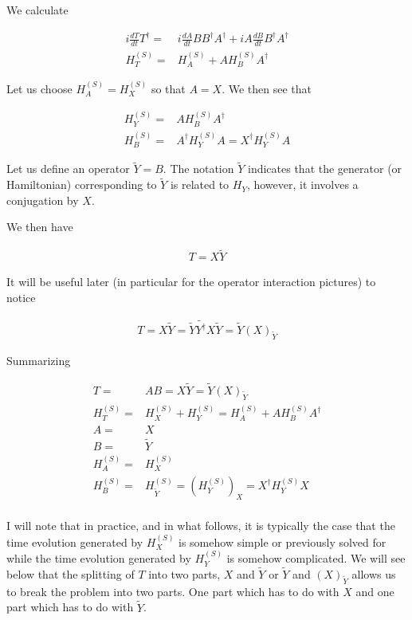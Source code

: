 \documentclass[12pt]{article}
\begin{document}
We calculate

\begin{align}
i\frac{dT}{dt}T^{\dag} =& i\frac{dA}{dt}BB^{\dag}A^{\dag} + iA\frac{dB}{dt}B^{\dag}A^{\dag} \nonumber\\
H_T^{(S)} =& H_A^{(S)} + AH_B^{(S)}A^{\dag}
\end{align}

Let us choose $H_A^{(S)} = H_X^{(S)}$ so that $A=X$.
We then see that 

\begin{align}
H_Y^{(S)} =& AH_B^{(S)}A^{\dag} \nonumber\\
H_B^{(S)} =& A^{\dag}H_Y^{(S)}A = X^{\dag}H_Y^{(S)}A
\end{align}

Let us define an operator $\tilde{Y}=B$.
The notation $\tilde{Y}$ indicates that the generator (or Hamiltonian) corresponding to $\tilde{Y}$ is related to $H_Y$, however, it involves a conjugation by $X$.

We then have

\begin{align}
T = X\tilde{Y}
\end{align}

It will be useful later (in particular for the operator interaction pictures) to notice

\begin{align}
T = X\tilde{Y} = \tilde{Y}\tilde{Y^{\dag}}X\tilde{Y} = \tilde{Y}(X)_{\tilde{Y}}
\end{align}

Summarizing

\begin{align}
T =& AB = X\tilde{Y} = \tilde{Y}(X)_{\tilde{Y}} \nonumber\\
H_T^{(S)} =& H_X^{(S)} + H_Y^{(S)} = H_A^{(S)} + AH_B^{(S)}A^{\dag} \nonumber\\
A =& X \nonumber\\
B =& \tilde{Y} \nonumber\\
H_A^{(S)} =& H_X^{(S)} \nonumber\\
H_B^{(S)} =& H_{\tilde{Y}}^{(S)} = \left(H_Y^{(S)}\right)_X = X^{\dag}H_Y^{(S)}X \nonumber\\
\end{align}

I will note that in practice, and in what follows, it is typically the case that the time evolution generated by $H_X^{(S)}$ is somehow simple or previously solved for while the time evolution generated by $H_Y^{(S)}$ is somehow complicated.
We will see below that the splitting of $T$ into two parts, $X$ and $\tilde{Y}$ or $\tilde{Y}$ and $(X)_{\tilde{Y}}$ allows us to break the problem into two parts.
One part which has to do with $X$ and one part which has to do with $\tilde{Y}$.
\end{document}
